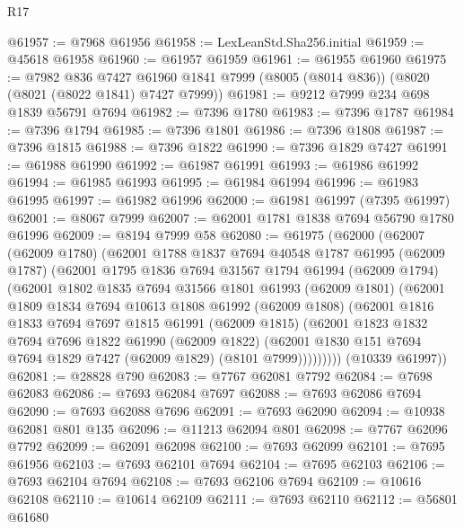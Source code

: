 \begin{lexlean}{R17}
\begin{coremodule}
@61957 := @7968 @61956
@61958 := LexLeanStd.Sha256.initial
@61959 := @45618 @61958
@61960 := @61957 @61959
@61961 := @61955 @61960
@61975 := @7982
    @836
    @7427
    @61960
    @1841
    @7999
    (@8005 (@8014 @836))
    (@8020 (@8021 (@8022 @1841) @7427 @7999))
@61981 := @9212 @7999 @234 @698 @1839 @56791 @7694
@61982 := @7396 @1780
@61983 := @7396 @1787
@61984 := @7396 @1794
@61985 := @7396 @1801
@61986 := @7396 @1808
@61987 := @7396 @1815
@61988 := @7396 @1822
@61990 := @7396 @1829 @7427
@61991 := @61988 @61990
@61992 := @61987 @61991
@61993 := @61986 @61992
@61994 := @61985 @61993
@61995 := @61984 @61994
@61996 := @61983 @61995
@61997 := @61982 @61996
@62000 := @61981 @61997 (@7395 @61997)
@62001 := @8067 @7999
@62007 := @62001 @1781 @1838 @7694 @56790 @1780 @61996
@62009 := @8194 @7999 @58
@62080 := @61975
    (@62000
      (@62007
        (@62009 @1780)
        (@62001
          @1788
          @1837
          @7694
          @40548
          @1787
          @61995
          (@62009 @1787)
          (@62001
            @1795
            @1836
            @7694
            @31567
            @1794
            @61994
            (@62009 @1794)
            (@62001
              @1802
              @1835
              @7694
              @31566
              @1801
              @61993
              (@62009 @1801)
              (@62001
                @1809
                @1834
                @7694
                @10613
                @1808
                @61992
                (@62009 @1808)
                (@62001
                  @1816
                  @1833
                  @7694
                  @7697
                  @1815
                  @61991
                  (@62009 @1815)
                  (@62001
                    @1823
                    @1832
                    @7694
                    @7696
                    @1822
                    @61990
                    (@62009 @1822)
                    (@62001 @1830 @151 @7694 @7694 @1829 @7427 (@62009 @1829) (@8101 @7999)))))))))
      (@10339 @61997))
@62081 := @28828 @790
@62083 := @7767 @62081 @7792
@62084 := @7698 @62083
@62086 := @7693 @62084 @7697
@62088 := @7693 @62086 @7694
@62090 := @7693 @62088 @7696
@62091 := @7693 @62090
@62094 := @10938 @62081 @801 @135
@62096 := @11213 @62094 @801
@62098 := @7767 @62096 @7792
@62099 := @62091 @62098
@62100 := @7693 @62099
@62101 := @7695 @61956
@62103 := @7693 @62101 @7694
@62104 := @7695 @62103
@62106 := @7693 @62104 @7694
@62108 := @7693 @62106 @7694
@62109 := @10616 @62108
@62110 := @10614 @62109
@62111 := @7693 @62110
@62112 := @56801 @61680

\end{coremodule}
\end{lexlean}
